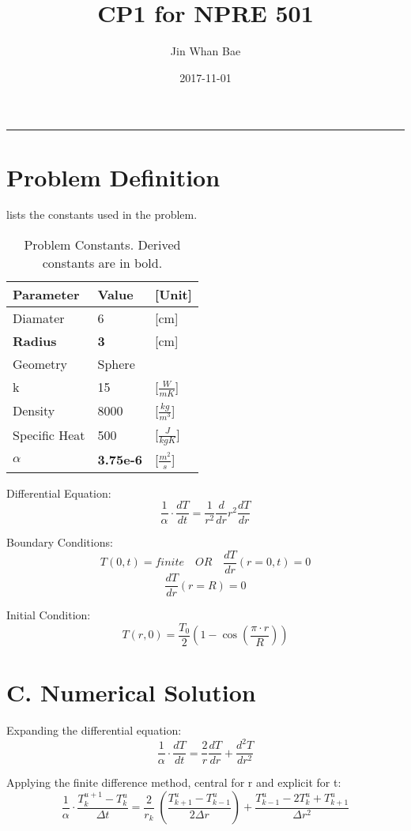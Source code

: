 \documentclass[12pt,letterpaper]{article}
\title{CP1 for NPRE 501}
\author{Jin Whan Bae}
\date{2017-11-01}
\begin{document}
	
	\maketitle
	\hrule
	\onehalfspacing
	\thispagestyle{empty}

\section{Problem Definition}

 lists the constants used in the problem.


\begin{table}[h]
     \centering
    \begin{tabularx}{\textwidth}{bbb}
       \hline
       Parameter & Value & [Unit] \\
       \hline
       Diamater & 6 & [cm] \\
       \textbf{Radius} & \textbf{3} & [cm] \\
       Geometry & Sphere \\
       k & 15 & [$ \frac{W}{mK} $] \\
       Density & 8000 & [$ \frac{kg}{m^3} $] \\
       Specific Heat & 500 & [$ \frac{J}{kgK} $] \\
       \textbf{$ \alpha$} & \textbf{3.75e-6} & [$ \frac{m^2}{s} $] \\
       \hline
    \end{tabularx}
    \caption {Problem Constants. Derived constants are in bold.}
    \label{tab:constants}
\end{table}

Differential Equation:
\[\frac{1}{\alpha} \cdot \frac{dT}{dt} = \frac{1}{r^2} \frac{d}{dr} r^2 \frac{dT}{dr}\]

Boundary Conditions:
\[T(0,t) = finite \quad OR \quad \frac{dT}{dr} (r = 0, t) = 0\]
\[\frac{dT}{dr} (r = R) = 0 \]

Initial Condition:
\[T(r,0) = \frac{T_0}{2} (1-\cos{(\frac{\pi \cdot r}{R})}) \]

\section{C. Numerical Solution}

Expanding the differential equation:
\[\frac{1}{\alpha} \cdot \frac{dT}{dt} = \frac{2}{r} \frac{dT}{dr} + \frac{d^2T}{dr^2}\]

Applying the finite difference method, central for r and explicit for t:
\[\frac{1}{\alpha} \cdot \frac{T_k^{u+1} - T_k^{u}}{\Delta t} = \frac{2}{r_k} \; (\frac{T^u_{k+1}-T^u_{k-1}}{2 \Delta r}) + \frac{T^u_{k-1} - 2T^u_k + T^u_{k+1}}{\Delta r^2}\]
\end{document}
